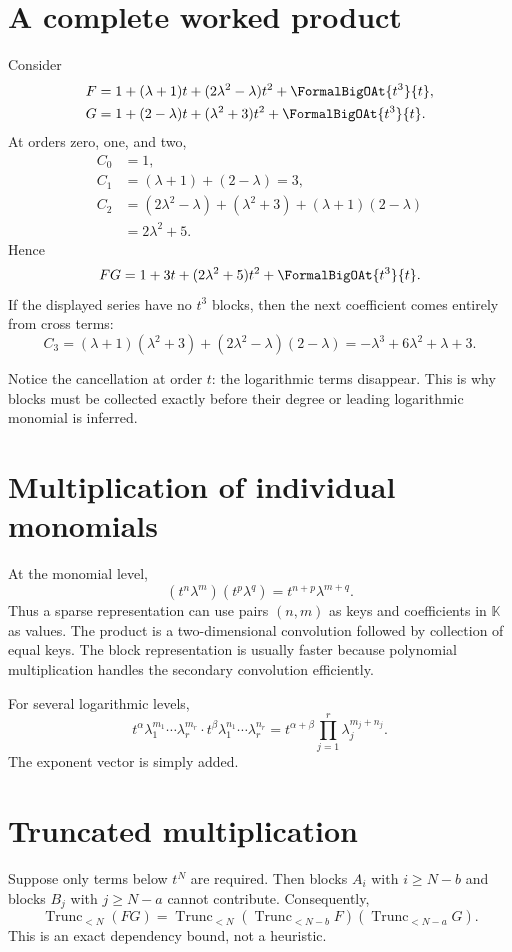 \documentclass[11pt,openany]{book}
\theoremstyle{definition}
\theoremstyle{plain}
\theoremstyle{remark}
\newcommand{\K}{\mathbb{K}}
\DeclareMathOperator{\trunc}{Trunc}
\begin{document}
\section{A complete worked product}
Consider
\begin{align*}
 F&=1+(\lambda+1)t+(2\lambda^2-\lambda)t^2+\FormalBigOAt{t^3}{t},\\
 G&=1+(2-\lambda)t+(\lambda^2+3)t^2+\FormalBigOAt{t^3}{t}.
\end{align*}
At orders zero, one, and two,
\begin{align*}
 C_0&=1,\\
 C_1&=(\lambda+1)+(2-\lambda)=3,\\
 C_2&=(2\lambda^2-\lambda)+(\lambda^2+3)
      +(\lambda+1)(2-\lambda)\\
 &=2\lambda^2+5.
\end{align*}
Hence
\begin{equation}\label{eq:worked-product}
 FG=1+3t+(2\lambda^2+5)t^2+\FormalBigOAt{t^3}{t}.
\end{equation}
If the displayed series have no \(t^3\) blocks, then the next coefficient comes entirely from cross terms:
\[
 C_3=(\lambda+1)(\lambda^2+3)+(2\lambda^2-\lambda)(2-\lambda)
 =-\lambda^3+6\lambda^2+\lambda+3.
\]

Notice the cancellation at order \(t\): the logarithmic terms disappear. This is why blocks must be collected exactly before their degree or leading logarithmic monomial is inferred.

\section{Multiplication of individual monomials}
At the monomial level,
\begin{equation}\label{eq:monomial-product}
 (t^n\lambda^m)(t^p\lambda^q)=t^{n+p}\lambda^{m+q}.
\end{equation}
Thus a sparse representation can use pairs \((n,m)\) as keys and coefficients in \(\K\) as values. The product is a two-dimensional convolution followed by collection of equal keys. The block representation is usually faster because polynomial multiplication handles the secondary convolution efficiently.

For several logarithmic levels,
\[
 t^\alpha\lambda_1^{m_1}\cdots\lambda_r^{m_r}
 \cdot
 t^\beta\lambda_1^{n_1}\cdots\lambda_r^{n_r}
 =t^{\alpha+\beta}\prod_{j=1}^r\lambda_j^{m_j+n_j}.
\]
The exponent vector is simply added.

\section{Truncated multiplication}
Suppose only terms below \(t^N\) are required. Then blocks \(A_i\) with \(i\ge N-b\) and blocks \(B_j\) with \(j\ge N-a\) cannot contribute. Consequently,
\begin{equation}\label{eq:truncated-product}
 \trunc_{<N}(FG)
 =\trunc_{<N}\left(\trunc_{<N-b}F\right)
                   \left(\trunc_{<N-a}G\right).
\end{equation}
This is an exact dependency bound, not a heuristic.
\end{document}
